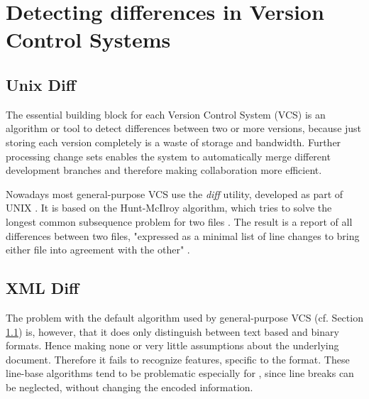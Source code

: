 \section{Detecting differences in Version Control Systems}
	\label{sec:background:diff}
	
	\subsection{Unix Diff}
	\label{sec:background:diff:unix-diff}
	The essential building block for each Version Control System (VCS) is an algorithm or tool to detect differences between two or more versions, because just storing each version completely is a waste of storage and bandwidth. Further processing change sets enables the system to automatically merge different development branches and therefore making collaboration more efficient.
	
	Nowadays most general-purpose VCS use the \emph{diff} utility, developed as part of UNIX \citep{Chacon2014,OSullivan2009,Collins-Sussman2004}. It is based on the Hunt-McIlroy algorithm, which tries to solve the longest common subsequence problem for two files \citep{Hunt1976}.
	The result is a report of all differences between two files, "expressed as a minimal list of line changes to bring either file into agreement with the other" \citep{Hunt1976}.
	

	
	\subsection{XML Diff}
	\label{sec:background:diff:xml-diff}
	The problem with the default algorithm used by general-purpose VCS (cf. Section \ref{sec:background:diff:unix-diff}) is, however, that it does only distinguish between text based and binary formats. Hence making none or very little assumptions about the underlying document. Therefore it fails to recognize features, specific to the format. These line-base algorithms tend to be problematic especially for \xml, since line breaks can be neglected, without changing the encoded information. \citep{Ronnau2005}
	
